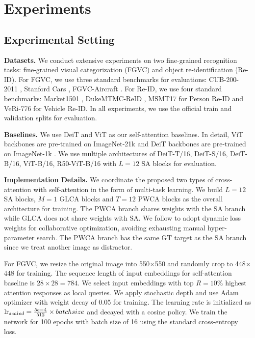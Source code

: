 \section{Experiments}




\subsection{Experimental Setting}
\textbf{Datasets.}
We conduct extensive experiments on two fine-grained recognition tasks: fine-grained visual categorization (FGVC) and object re-identification (Re-ID). For FGVC, we use three standard benchmarks for evaluations: CUB-200-2011 \cite{wah2011caltech}, Stanford Cars \cite{krause20133d}, FGVC-Aircraft \cite{maji2013fine}.
For Re-ID, we use four standard benchmarks: Market1501 \cite{zheng2015scalable}, DukeMTMC-ReID \cite{wu2020deep}, MSMT17 \cite{wei2018person} for Person Re-ID and VeRi-776 \cite{zheng2020vehiclenet} for Vehicle Re-ID. In all experiments, we use the official train and validation splits for evaluation.

\textbf{Baselines.} 
We use DeiT and ViT as our self-attention baselines. In detail, ViT backbones are pre-trained on ImageNet-21k \cite{deng2009imagenet} and DeiT backbones are pre-trained on ImageNet-1k \cite{deng2009imagenet}. We use multiple architectures of DeiT-T/16, DeiT-S/16, DeiT-B/16, ViT-B/16, R50-ViT-B/16 with $L=12$ SA blocks for evaluation.

\textbf{Implementation Details.} 
We coordinate the proposed two types of cross-attention with self-attention in the form of multi-task learning. We build $L=12$ SA blocks, $M=1$ GLCA blocks and $T=12$ PWCA blocks as the overall architecture for training. The PWCA branch shares weights with the SA branch while GLCA does not share weights with SA. We follow \cite{zhang2021fairmot} to adopt dynamic loss weights for collaborative optimization, avoiding exhausting manual hyper-parameter search. The PWCA branch has the same GT target as the SA branch since we treat another image as distractor.

For FGVC, we resize the original image into 550$\times$550 and randomly crop to 448$\times$448 for training. The sequence length of input embeddings for self-attention baseline is $28\times 28=784$. We select input embeddings with top $R=10\%$ highest attention responses as local queries. We apply stochastic depth \cite{huang2016deep} and use Adam optimizer with weight decay of 0.05 for training. The learning rate is initialized as ${\rm lr}_{scaled}=\frac{5e-4}{512}\times batchsize$ and decayed with a cosine policy. We train the network for 100 epochs with batch size of 16 using the standard cross-entropy loss. 

